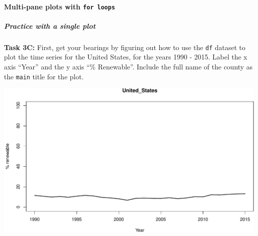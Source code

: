\documentclass[]{book}
\newenvironment{Shaded}{\begin{snugshade}}{\end{snugshade}}
\newcommand{\CommentTok}[1]{\textcolor[rgb]{0.56,0.35,0.01}{\textit{#1}}}
\newcommand{\DataTypeTok}[1]{\textcolor[rgb]{0.13,0.29,0.53}{#1}}
\newcommand{\DecValTok}[1]{\textcolor[rgb]{0.00,0.00,0.81}{#1}}
\newcommand{\KeywordTok}[1]{\textcolor[rgb]{0.13,0.29,0.53}{\textbf{#1}}}
\newcommand{\NormalTok}[1]{#1}
\newcommand{\StringTok}[1]{\textcolor[rgb]{0.31,0.60,0.02}{#1}}
\let\oldparagraph\paragraph
\renewcommand{\paragraph}[1]{\oldparagraph{#1}\mbox{}}
\let\oldsubparagraph\subparagraph
\renewcommand{\subparagraph}[1]{\oldsubparagraph{#1}\mbox{}}
\begin{document}
\hypertarget{multi-pane-plots-with-for-loops}{%
\paragraph{\texorpdfstring{Multi-pane plots with \texttt{for\ loops}}{Multi-pane plots with for loops}}\label{multi-pane-plots-with-for-loops}}

\hypertarget{practice-with-a-single-plot}{%
\subparagraph{Practice with a single plot}\label{practice-with-a-single-plot}}

\textbf{Task 3C:} First, get your bearings by figuring out how to use the \texttt{df} dataset to plot the time series for the United States, for the years 1990 - 2015. Label the x axis ``Year'' and the y axis ``\% Renewable''. Include the full name of the county as the \texttt{main} title for the plot.

\begin{Shaded}
\end{Shaded}

\includegraphics{figures/unnamed-chunk-566-1.pdf}
\end{document}
